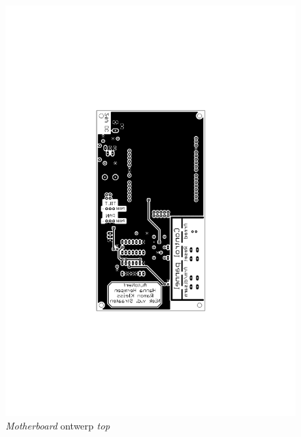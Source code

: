 \begin{figure}
    \includegraphics[scale=0.75]{figures/motherboard_top.pdf}
    \caption{\emph{Motherboard} ontwerp \emph{top}}
\end{figure}

